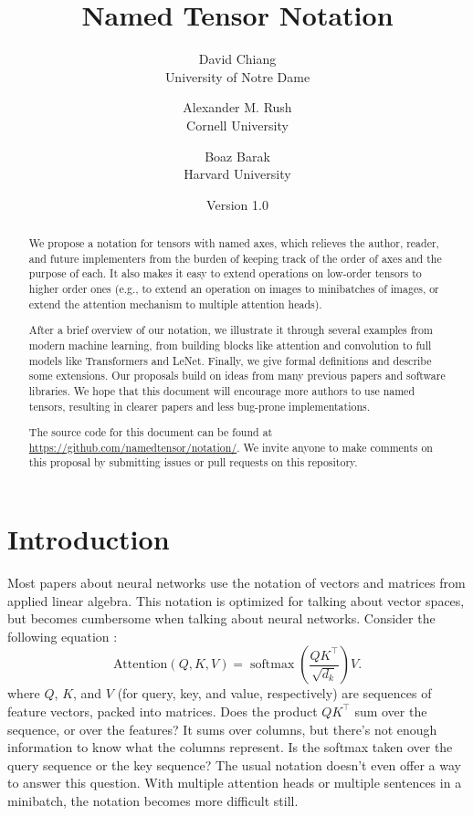 \documentclass{article}
\title{\bf Named Tensor Notation}
\author{David Chiang \\ \small University of Notre Dame \and Alexander M. Rush \\ \small Cornell University \and Boaz Barak \\ \small Harvard University}
\date{Version 1.0}
\DeclareMathOperator*{\softmax}{softmax}
\begin{document}
\maketitle

\begin{abstract}
We propose a notation for tensors with named axes, which relieves the author, reader, and future implementers from the burden of keeping track of the order of axes and the purpose of each. It also makes it easy to extend operations on low-order tensors to higher order ones (e.g., to extend an operation on images to minibatches of images, or extend the attention mechanism to multiple attention heads).

After a brief overview of our notation, we illustrate it through several examples from modern machine learning, from building blocks like attention and convolution to full models like Transformers and LeNet. Finally, we give formal definitions and describe some extensions. Our proposals build on ideas from many previous papers and software libraries. We hope that this document will encourage more authors to use named tensors, resulting in clearer papers and less bug-prone implementations.

The source code for this document can be found at \url{https://github.com/namedtensor/notation/}. We invite anyone to make comments on this proposal by submitting issues or pull requests on this repository.
\end{abstract}

\setcounter{tocdepth}{1}
\tableofcontents

\clearpage

\section{Introduction}
\label{sec:intro}

Most papers about neural networks use the notation of vectors and matrices from applied linear algebra. This notation is optimized for talking about vector spaces, but becomes cumbersome when talking about neural networks. Consider the following equation \citep{vaswani+:2017}:
\[ \text{Attention}(Q, K, V) = \softmax \left( \frac{QK^\top}{\sqrt{d_k}} \right) V. \]
where $Q$, $K$, and $V$ (for query, key, and value, respectively) are sequences of feature vectors, packed into matrices. Does the product $QK^\top$ sum over the sequence, or over the features? It sums over columns, but there's not enough information to know what the columns represent. Is the softmax taken over the query sequence or the key sequence? The usual notation doesn't even offer a way to answer this question. With multiple attention heads or multiple sentences in a minibatch, the notation becomes more difficult still.
\end{document}
